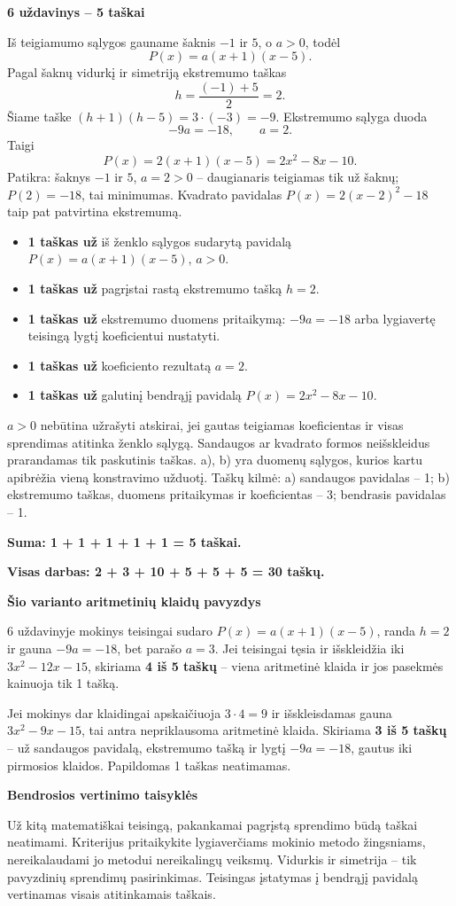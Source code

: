 \documentclass[11pt]{article}
\newcommand{\sk}[1]{\par\medskip\textbf{#1}\par}
\begin{document}
\sk{6 uždavinys -- 5 taškai}
Iš teigiamumo sąlygos gauname šaknis $-1$ ir $5$, o $a>0$, todėl
\[P(x)=a(x+1)(x-5).\]
Pagal šaknų vidurkį ir simetriją ekstremumo taškas
\[h=\frac{(-1)+5}2=2.\]
Šiame taške $(h+1)(h-5)=3\cdot(-3)=-9$. Ekstremumo sąlyga duoda
\[-9a=-18,\qquad a=2.\]
Taigi
\[\boxed{P(x)=2(x+1)(x-5)=2 x^{2} - 8 x - 10}.\]
Patikra: šaknys $-1$ ir $5$, $a=2>0$ -- daugianaris teigiamas tik už šaknų; $P(2)=-18$, tai minimumas. Kvadrato pavidalas $P(x)=2(x-2)^2-18$ taip pat patvirtina ekstremumą.
\begin{itemize}
\item \textbf{1 taškas už} iš ženklo sąlygos sudarytą pavidalą $P(x)=a(x+1)(x-5)$, $a>0$.
\item \textbf{1 taškas už} pagrįstai rastą ekstremumo tašką $h=2$.
\item \textbf{1 taškas už} ekstremumo duomens pritaikymą: $-9a=-18$ arba lygiavertę teisingą lygtį koeficientui nustatyti.
\item \textbf{1 taškas už} koeficiento rezultatą $a=2$.
\item \textbf{1 taškas už} galutinį bendrąjį pavidalą $P(x)=2 x^{2} - 8 x - 10$.
\end{itemize}
$a>0$ nebūtina užrašyti atskirai, jei gautas teigiamas koeficientas ir visas sprendimas atitinka ženklo sąlygą. Sandaugos ar kvadrato formos neišskleidus prarandamas tik paskutinis taškas. a), b) yra duomenų sąlygos, kurios kartu apibrėžia vieną konstravimo užduotį. Taškų kilmė: a) sandaugos pavidalas -- 1; b) ekstremumo taškas, duomens pritaikymas ir koeficientas -- 3; bendrasis pavidalas -- 1.\par\textbf{Suma: 1 + 1 + 1 + 1 + 1 = 5 taškai.}\par\textbf{Visas darbas: 2 + 3 + 10 + 5 + 5 + 5 = 30 taškų.}

\sk{Šio varianto aritmetinių klaidų pavyzdys}
6 uždavinyje mokinys teisingai sudaro $P(x)=a(x+1)(x-5)$, randa $h=2$ ir gauna $-9a=-18$, bet parašo $a=3$. Jei teisingai tęsia ir išskleidžia iki $3 x^{2} - 12 x - 15$, skiriama \textbf{4 iš 5 taškų} -- viena aritmetinė klaida ir jos pasekmės kainuoja tik 1 tašką.

Jei mokinys dar klaidingai apskaičiuoja $3\cdot4=9$ ir išskleisdamas gauna $3 x^{2} - 9 x - 15$, tai antra nepriklausoma aritmetinė klaida. Skiriama \textbf{3 iš 5 taškų} -- už sandaugos pavidalą, ekstremumo tašką ir lygtį $-9a=-18$, gautus iki pirmosios klaidos. Papildomas 1 taškas neatimamas.
\newpage
\sk{Bendrosios vertinimo taisyklės}
Už kitą matematiškai teisingą, pakankamai pagrįstą sprendimo būdą taškai neatimami. Kriterijus pritaikykite lygiaverčiams mokinio metodo žingsniams, nereikalaudami jo metodui nereikalingų veiksmų. Vidurkis ir simetrija -- tik pavyzdinių sprendimų pasirinkimas. Teisingas įstatymas į bendrąjį pavidalą vertinamas visais atitinkamais taškais.
\end{document}
